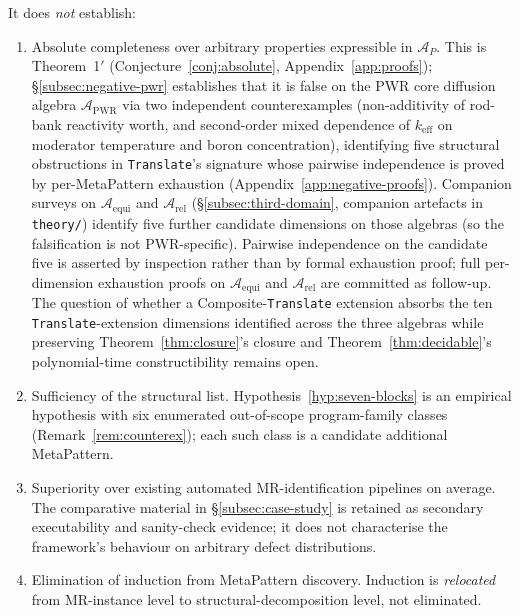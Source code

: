 \documentclass[acmsmall,screen,review]{acmart}
\begin{document}
\begin{tcolorbox}[breakable,colback=gray!5,colframe=black!50,arc=2pt,boxrule=0.5pt,fontupper=\small,title=Boundary of contribution,fonttitle=\small\bfseries]
It does \emph{not} establish:
\begin{enumerate}[leftmargin=*,nosep]
  \item[(a)] Absolute completeness over arbitrary properties expressible in $\mathcal{A}_P$. This is Theorem~1$'$ (Conjecture~\ref{conj:absolute}, Appendix~\ref{app:proofs}); \S\ref{subsec:negative-pwr} establishes that it is false on the PWR core diffusion algebra $\mathcal{A}_{\mathrm{PWR}}$ via two independent counterexamples (non-additivity of rod-bank reactivity worth, and second-order mixed dependence of $k_{\mathrm{eff}}$ on moderator temperature and boron concentration), identifying five structural obstructions in \texttt{Translate}'s signature whose pairwise independence is proved by per-MetaPattern exhaustion (Appendix~\ref{app:negative-proofs}). Companion surveys on $\mathcal{A}_{\mathrm{equi}}$ and $\mathcal{A}_{\mathrm{rel}}$ (\S\ref{subsec:third-domain}, companion artefacts in \texttt{theory/}) identify five further candidate dimensions on those algebras (so the falsification is not PWR-specific). Pairwise independence on the candidate five is asserted by inspection rather than by formal exhaustion proof; full per-dimension exhaustion proofs on $\mathcal{A}_{\mathrm{equi}}$ and $\mathcal{A}_{\mathrm{rel}}$ are committed as follow-up. The question of whether a Composite-\texttt{Translate} extension absorbs the ten \texttt{Translate}-extension dimensions identified across the three algebras while preserving Theorem~\ref{thm:closure}'s closure and Theorem~\ref{thm:decidable}'s polynomial-time constructibility remains open.
  \item[(b)] Sufficiency of the structural list. Hypothesis~\ref{hyp:seven-blocks} is an empirical hypothesis with six enumerated out-of-scope program-family classes (Remark~\ref{rem:counterex}); each such class is a candidate additional MetaPattern.
  \item[(c)] Superiority over existing automated MR-identification pipelines on average. The comparative material in \S\ref{subsec:case-study} is retained as secondary executability and sanity-check evidence; it does not characterise the framework's behaviour on arbitrary defect distributions.
  \item[(d)] Elimination of induction from MetaPattern discovery. Induction is \emph{relocated} from MR-instance level to structural-decomposition level, not eliminated.
\end{enumerate}
\end{tcolorbox}
\end{document}
